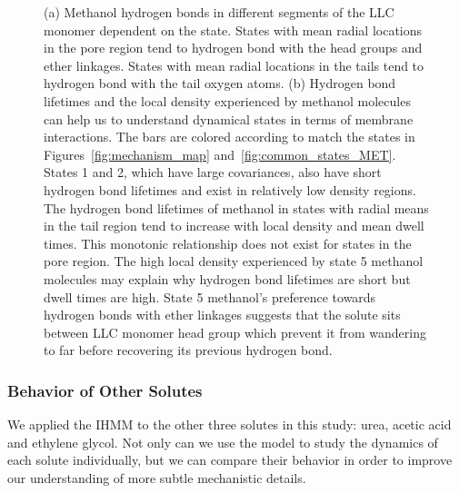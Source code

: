 \documentclass[journal=jpcbfk,manuscript=article]{achemso}
\begin{document}
\begin{figure}
  \caption{(a) Methanol hydrogen bonds in different segments of the LLC monomer
  dependent on the state. States with mean radial locations in the pore region tend to
  hydrogen bond with the head groups and ether linkages. States with mean radial
  locations in the tails tend to hydrogen bond with the tail oxygen atoms.
  (b) Hydrogen bond lifetimes and the local density experienced by methanol
  molecules can help us to understand dynamical states in terms of membrane 
  interactions. The bars are colored according to match the states in Figures~\ref{fig:mechanism_map}
  and~\ref{fig:common_states_MET}. States 1 and 2, which have large covariances, also have short
  hydrogen bond lifetimes and exist in relatively low density regions. The
  hydrogen bond lifetimes of methanol in states with radial means in the tail
  region tend to increase with local density and mean dwell times. 
  This monotonic
  relationship does not exist for states in the pore region. The high 
  local density experienced by state 5 methanol molecules may explain why 
  hydrogen bond lifetimes are short but dwell times are high. State 5 methanol's
  preference towards hydrogen bonds with ether linkages suggests that the solute
  sits between LLC monomer head group which prevent it from wandering to far
  before recovering its previous hydrogen bond.
  }\label{fig:hbond_pichart}
  \end{figure}
  
  
  \subsubsection*{Behavior of Other Solutes}

  We applied the IHMM to the other three solutes in this study: urea, acetic acid
  and ethylene glycol. Not only can we use the model to study the dynamics of each 
  solute individually, but we can compare their behavior in order to improve our
  understanding of more subtle mechanistic details.
  
\end{document}
